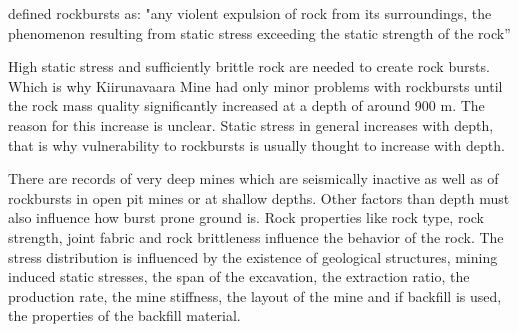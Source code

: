 \textcite[582]{Obert67} defined rockbursts as: 
 "any violent expulsion of rock from its surroundings, the phenomenon resulting from static stress exceeding the static strength of the rock''

High static stress and sufficiently brittle rock are needed to create rock bursts. \autocite[6]{Brauner94} \autocite[2.10]{canada96} Which is why Kiirunavaara Mine had only minor problems with rockbursts until the rock mass quality significantly increased at a depth of around 900 m. The reason for this increase is unclear. \autocite[4]{dahner12} %
 Static stress in general increases with depth, that is why vulnerability to rockbursts is usually thought to increase with depth. \autocite[8]{Brauner94}

There are records of very deep mines which are seismically inactive as well as of rockbursts in open pit mines or at shallow depths. %
\autocite[584]{Obert67} Other factors than depth must also influence how burst prone ground is.
Rock properties like rock type, rock strength, joint fabric and rock brittleness influence the behavior of the rock. The stress distribution is influenced by the existence of geological structures, mining induced static stresses, the span of the excavation, the extraction ratio, the production rate, the  mine stiffness, the layout of the mine and if backfill is used, the properties of the backfill material.  \autocite[2.10]{canada96} \autocite[219]{Kaiser12} \autocite[8]{Brauner94} 


